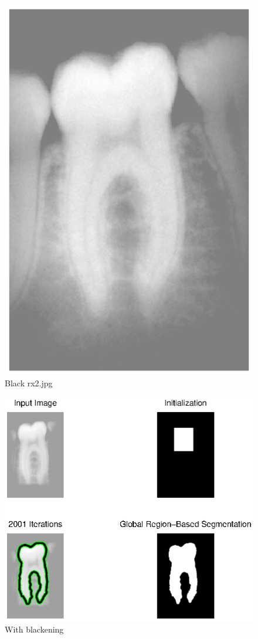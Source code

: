 \begin{figure}[H]
\centering
\includegraphics[scale=0.7]{images/blackrx2.eps}
\caption{Black rx2.jpg}
\label{blackrx2}
\end{figure}

\begin{figure}[H]
\centering
\includegraphics[scale=0.7]{images/cvonblackrx2.eps}
\caption{With blackening}
\label{withblack}
\end{figure}

